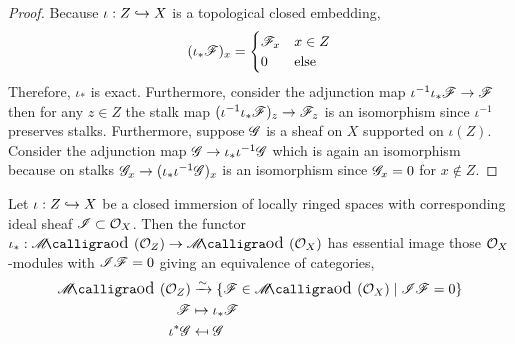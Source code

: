 \documentclass[12pt]{article}
\begin{document}
\begin{proof}
Because $\iota : Z \hookrightarrow X$ is a topological closed embedding,
\[ (\iota_* \mathscr{F})_x = 
\begin{cases}
\mathscr{F}_x & x \in Z
\\
0 & \text{else} 
\end{cases} \]
Therefore, $\iota_*$ is exact. Furthermore, consider the adjunction map $\iota^{-1} \iota_* \mathscr{F} \to \mathscr{F}$ then for any $z \in Z$ the stalk map $(\iota^{-1} \iota_* \mathscr{F})_z \to \mathscr{F}_z$ is an isomorphism since $\iota^{-1}$ preserves stalks. Furthermore, suppose $\mathscr{G}$ is a sheaf on $X$ supported on $\iota(Z)$. Consider the adjunction map $\mathscr{G} \to \iota_* \iota^{-1} \mathscr{G}$ which is again an isomorphism because on stalks $\mathscr{G}_x \to (\iota_* \iota^{-1} \mathscr{G})_x$ is an isomorphism since $\mathscr{G}_x = 0$ for $x \notin Z$.
\end{proof}

\begin{prop}
Let $\iota : Z \hookrightarrow X$ be a closed immersion of locally ringed spaces with corresponding ideal sheaf $\mathscr{I} \subset \mathcal{O}_{X}$. Then the functor $\iota_* : \shMod{\struct{Z}} \to \shMod{\struct{X}}$ has essential image those $\mathcal{O}_{X}$-modules with $\mathscr{I} \mathscr{F} = 0$ giving an equivalence of categories,
\begin{align*}
\shMod{\struct{Z}} & \iso \{ \F \in \shMod{\struct{X}} \mid \I \F = 0 \}
\\
\F & \mapsto \iota_* \F
\\
\iota^{*} \G & \mapsfrom \G
\end{align*}
\end{prop}
\end{document}

